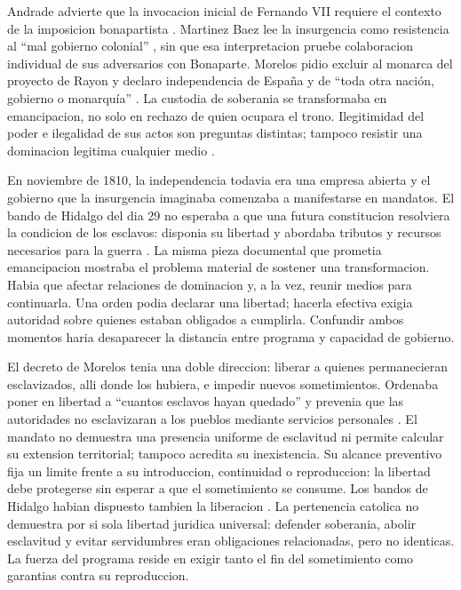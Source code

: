 \documentclass[spanish,letterpaper,oneside]{article}
\begin{document}
Andrade advierte que la invocacion inicial de Fernando VII requiere
el contexto de la imposicion bonapartista \citep[p.~75]{andrade2003}.
Martinez Baez lee la insurgencia como resistencia al ``mal gobierno
colonial'' \citep[p.~209]{martinezBaez2021}, sin que esa interpretacion
pruebe colaboracion individual de sus adversarios con Bonaparte.
Morelos pidio excluir al monarca del proyecto de Rayon y declaro
independencia de España y de ``toda otra nación, gobierno o monarquía''
\citep[p.~53]{morelosObservaciones2021}\citep[num.~1]{morelos2020}.
La custodia de soberania se transformaba en emancipacion, no solo
en rechazo de quien ocupara el trono. Ilegitimidad del poder e
ilegalidad de sus actos son preguntas distintas; tampoco resistir
una dominacion legitima cualquier medio \citep{garciaRicci2011,kriele2022}.

En noviembre de 1810, la independencia todavia era una empresa
abierta y el gobierno que la insurgencia imaginaba comenzaba a
manifestarse en mandatos. El bando de Hidalgo del dia 29 no esperaba
a que una futura constitucion resolviera la condicion de los esclavos:
disponia su libertad y abordaba tributos y recursos necesarios para
la guerra \citep[pp.~38--40]{hidalgo2021}. La misma pieza documental
que prometia emancipacion mostraba el problema material de sostener
una transformacion. Habia que afectar relaciones de dominacion y,
a la vez, reunir medios para continuarla. Una orden podia declarar
una libertad; hacerla efectiva exigia autoridad sobre quienes estaban
obligados a cumplirla. Confundir ambos momentos haria desaparecer
la distancia entre programa y capacidad de gobierno.

El decreto de Morelos tenia una doble direccion: liberar a quienes
permanecieran esclavizados, alli donde los hubiera, e impedir nuevos
sometimientos. Ordenaba poner en libertad a ``cuantos esclavos hayan
quedado'' y prevenia que las autoridades no esclavizaran a los pueblos
mediante servicios personales \citep[p.~91]{morelosAbolicion2021}.
El mandato no demuestra una presencia uniforme de esclavitud ni
permite calcular su extension territorial; tampoco acredita su
inexistencia. Su alcance preventivo fija un limite frente a su
introduccion, continuidad o reproduccion: la libertad debe protegerse
sin esperar a que el sometimiento se consume.
Los bandos de Hidalgo habian dispuesto tambien la liberacion
\citep[pp.~38--40]{hidalgo2021}. La pertenencia catolica no demuestra
por si sola libertad juridica universal: defender soberania, abolir
esclavitud y evitar servidumbres eran obligaciones relacionadas,
pero no identicas. La fuerza del programa reside en exigir tanto
el fin del sometimiento como garantias contra su reproduccion.
\end{document}
